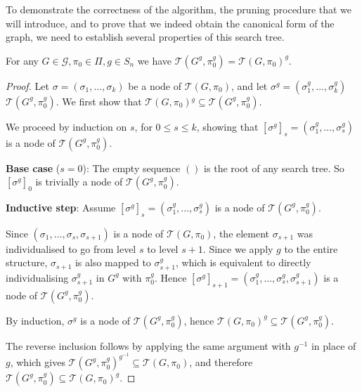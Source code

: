To demonstrate the correctness of the algorithm, the pruning procedure that we will introduce, and to prove that we indeed obtain the canonical form of the graph, we need to establish several properties of this search tree.

\vspace{0.5em}

\begin{lemma}\label{lem: equivariance of the search tree}
  For any $G \mathrel{\in}\mathcal{G}, \pi_0\mathrel{\in}\Pi, g\mathrel{\in}S_n$ we have $\mathcal{T} (G^g, \pi_0^g) = \mathcal{T} {(G, \pi_0)}^g $.
  \end{lemma}

\vspace{-0.7em}
  \begin{proof}
    Let $\sigma = (\sigma_1, \ldots, \sigma_k)$ be a node of $\mathcal{T}(G, \pi_0)$, and let $\sigma^g = (\sigma_1^g, \ldots, \sigma_k^g)$ $\mathcal{T}(G^{g}, \pi_0^{g})$. We first show that $\mathcal{T}(G, \pi_0){^g} \subseteq \mathcal{T}(G^g, \pi_0^g)$.

    
    We proceed by induction on $s$, for $0 \leq s \leq k$, showing that ${[\sigma^g]}_s = (\sigma_1^g, \ldots, \sigma_s^g)$ is a node of  $\mathcal{T}(G^g, \pi_0^g)$.
    
    \textbf{Base case} ($s = 0$): The empty sequence $()$ is the root of any search tree.
    So ${[\sigma^g]}_0$ is trivially a node of $\mathcal{T}(G^g, \pi_0^g)$.
    
    \textbf{Inductive step}: Assume ${[\sigma^g]}_s = (\sigma_1^g, \ldots, \sigma_s^g)$ is a node of $\mathcal{T}(G^g, \pi_0^g)$. 
    
    Since $(\sigma_1, \ldots, \sigma_s, \sigma_{s+1})$ is a node of
    $\mathcal{T}(G, \pi_0)$, the element $\sigma_{s+1}$ was individualised to go from level $s$
    to level $s+1$. Since we apply $g$ to the entire structure, $\sigma_{s+1}$ is also mapped
    to $\sigma_{s+1}^g$, which is equivalent to directly individualising $\sigma_{s+1}^g$ in $G^g$
    with $\pi_0^g$. Hence ${[\sigma^g]}_{s+1} = (\sigma_1^g, \ldots, \sigma_s^g, \sigma_{s+1}^g)$ is a node of
    $\mathcal{T}(G^g, \pi_0^g)$.
    
    By induction, $\sigma^g$ is a node of $\mathcal{T}(G^g, \pi_0^g)$, hence
    $\mathcal{T}{(G, \pi_0)}^g \subseteq \mathcal{T}(G^g, \pi_0^g)$.
    
    The reverse inclusion follows by applying the same argument with $g^{-1}$
    in place of $g$, which gives
    $\mathcal{T}{(G^g, \pi_0^g)}^{g^{-1}} \subseteq \mathcal{T}(G, \pi_0)$,
    and therefore $\mathcal{T}(G^g, \pi_0^g) \subseteq \mathcal{T}{(G, \pi_0)}^g$.
    \end{proof}
  
